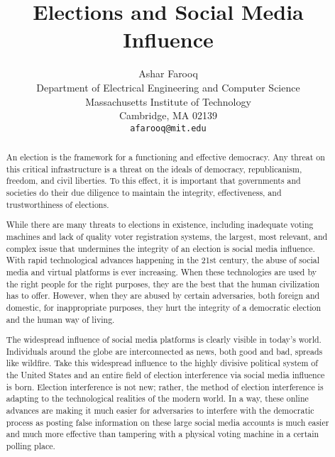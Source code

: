 \documentclass{article}
\title{Elections and Social Media Influence}
\author{
  Ashar Farooq\\
  Department of Electrical Engineering and Computer Science\\
  Massachusetts Institute of Technology\\
  Cambridge, MA 02139 \\
  \texttt{afarooq@mit.edu} \\
}
\begin{document}
\maketitle
\begin{abstract}
An election is the framework for a functioning and effective democracy. Any threat on this critical infrastructure is a threat on the ideals of democracy, republicanism, freedom, and civil liberties. To this effect, it is important that governments and societies do their due diligence to maintain the integrity, effectiveness, and trustworthiness of elections. 

\vspace{5mm} %

While there are many threats to elections in existence, including inadequate voting machines and lack of quality voter registration systems, the largest, most relevant, and complex issue that undermines the integrity of an election is social media influence. With rapid technological advances happening in the 21st century, the abuse of social media and virtual platforms is ever increasing. When these technologies are used by the right people for the right purposes, they are the best that the human civilization has to offer. However, when they are abused by certain adversaries, both foreign and domestic, for inappropriate purposes, they hurt the integrity of a democratic election and the human way of living. 

\vspace{5mm} %

The widespread influence of social media platforms is clearly visible in today's world. Individuals around the globe are interconnected as news, both good and bad, spreads like wildfire. Take this widespread influence to the highly divisive political system of the United States and an entire field of election interference via social media influence is born. Election interference is not new; rather, the method of election interference is adapting to the technological realities of the modern world. In a way, these online advances are making it much easier for adversaries to interfere with the democratic process as posting false information on these large social media accounts is much easier and much more effective than tampering with a physical voting machine in a certain polling place. 

\vspace{5mm} %


\end{abstract}
\end{document}
